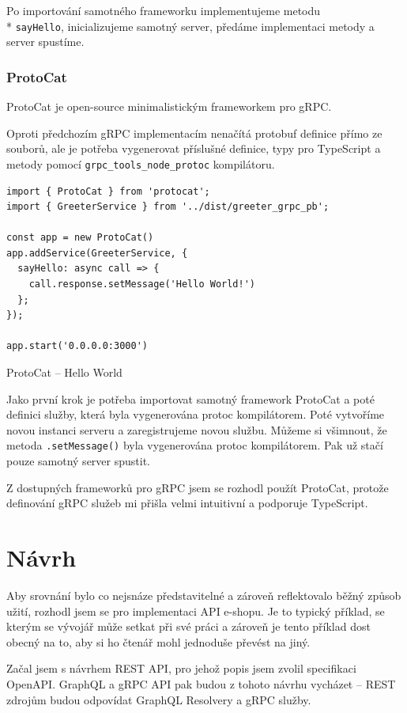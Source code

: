 \documentclass[thesis=M,czech]{FITthesis}[2019/12/23]
\begin{document}
Po importování samotného frameworku implementujeme metodu \\* \texttt{sayHello}, inicializujeme samotný server, předáme implementaci metody a server spustíme.

\subsection{ProtoCat}
ProtoCat \cite{protocat} je open-source minimalistickým frameworkem pro gRPC.

Oproti předchozím gRPC implementacím nenačítá protobuf definice přímo ze souborů, ale je potřeba vygenerovat příslušné definice, typy pro TypeScript a metody pomocí \texttt{grpc_tools_node_protoc} kompilátoru.

\begin{listing}[h]
\begin{verbatim}
import { ProtoCat } from 'protocat';
import { GreeterService } from '../dist/greeter_grpc_pb';

const app = new ProtoCat()
app.addService(GreeterService, {
  sayHello: async call => {
    call.response.setMessage('Hello World!')
  };
});
  
app.start('0.0.0.0:3000')
\end{verbatim}
\caption{ProtoCat -- Hello World}
\label{lst:protocat_hello}
\end{listing}

Jako první krok je potřeba importovat samotný framework ProtoCat a poté definici služby, která byla vygenerována protoc kompilátorem. Poté vytvoříme novou instanci serveru a zaregistrujeme novou službu. Můžeme si všimnout, že metoda \texttt{.setMessage()} byla vygenerována protoc kompilátorem. Pak už stačí pouze samotný server spustit.

Z dostupných frameworků pro gRPC jsem se rozhodl použít ProtoCat, protože definování gRPC služeb mi přišla velmi intuitivní a podporuje TypeScript. %

\chapter{Návrh}
Aby srovnání bylo co nejsnáze představitelné a zároveň reflektovalo běžný způsob užití, rozhodl jsem se pro implementaci API e-shopu. Je to typický příklad, se kterým se vývojář může setkat při své práci a zároveň je tento příklad dost obecný na to, aby si ho čtenář mohl jednoduše převést na jiný. 

Začal jsem s návrhem REST API, pro jehož popis jsem zvolil specifikaci OpenAPI. GraphQL a gRPC API pak budou z tohoto návrhu vycházet -- REST zdrojům budou odpovídat GraphQL Resolvery a gRPC služby.
\end{document}
